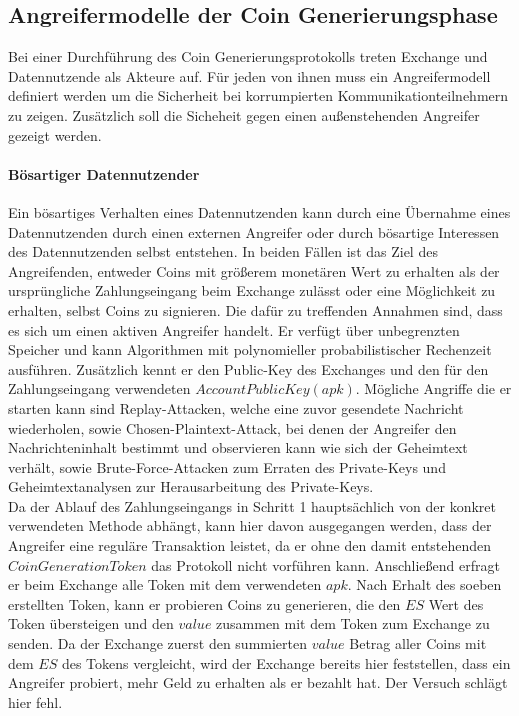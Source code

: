 \documentclass[
	fontsize=12pt,
	headings=small,
	parskip=half,           %
	bibliography=totoc,
	numbers=noenddot,       %
	open=any,               %
]{scrreprt}
\begin{document}
\subsection{Angreifermodelle der Coin Generierungsphase}
\label{subsec:adversaryCoinGen}
Bei einer Durchführung des Coin Generierungsprotokolls treten Exchange und Datennutzende als Akteure auf. Für jeden von ihnen muss ein Angreifermodell definiert werden um die Sicherheit bei korrumpierten Kommunikationteilnehmern zu zeigen. Zusätzlich soll die Sicheheit gegen einen außenstehenden Angreifer gezeigt werden.

\paragraph{Bösartiger Datennutzender}
Ein bösartiges Verhalten eines Datennutzenden kann durch eine Übernahme eines Datennutzenden durch einen externen Angreifer oder durch bösartige Interessen des Datennutzenden selbst entstehen. In beiden Fällen ist das Ziel des Angreifenden, entweder Coins mit größerem monetären Wert zu erhalten als der ursprüngliche Zahlungseingang beim Exchange zulässt oder eine Möglichkeit zu erhalten, selbst Coins zu signieren. Die dafür zu treffenden Annahmen sind, dass es sich um einen aktiven Angreifer handelt. Er verfügt über unbegrenzten Speicher und kann Algorithmen mit polynomieller probabilistischer Rechenzeit ausführen. Zusätzlich kennt er den Public-Key des Exchanges und den für den Zahlungseingang verwendeten $AccountPublicKey (apk)$. Mögliche Angriffe die er starten kann sind Replay-Attacken, welche eine zuvor gesendete Nachricht wiederholen, sowie Chosen-Plaintext-Attack, bei denen der Angreifer den Nachrichteninhalt bestimmt und observieren kann wie sich der Geheimtext verhält, sowie Brute-Force-Attacken zum Erraten des Private-Keys und Geheimtextanalysen zur Herausarbeitung des Private-Keys.\\

Da der Ablauf des Zahlungseingangs in Schritt 1 hauptsächlich von der konkret verwendeten Methode abhängt, kann hier davon ausgegangen werden, dass der Angreifer eine reguläre Transaktion leistet, da er ohne den damit entstehenden $CoinGenerationToken$ das Protokoll nicht vorführen kann. 
Anschließend erfragt er beim Exchange alle Token mit dem verwendeten $apk$. Nach Erhalt des soeben erstellten Token, kann er probieren Coins zu generieren, die den $ES$ Wert des Token übersteigen und den $value$ zusammen mit dem Token zum Exchange zu senden. Da der Exchange zuerst den summierten $value$ Betrag aller Coins mit dem $ES$ des Tokens vergleicht, wird der Exchange bereits hier feststellen, dass ein Angreifer probiert, mehr Geld zu erhalten als er bezahlt hat. Der Versuch schlägt hier fehl.\\
\end{document}
